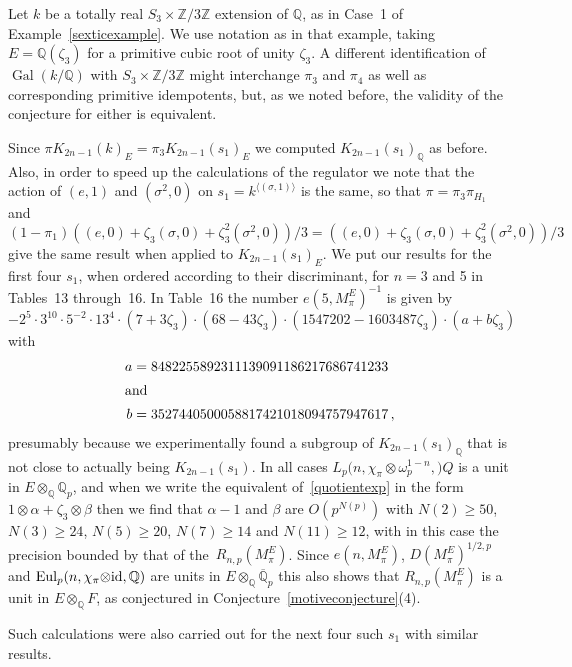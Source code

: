 \documentclass{amsart}
\begin{document}
\begin{example}\label{sexticcomputation}
Let $ k $ be a totally real $ S_3 \times {\mathbb Z}/3{\mathbb Z} $ extension of $ {\mathbb Q} $, as in Case~1 of Example~\ref{sexticexample}.
We use notation as in that example, taking $ E={\mathbb Q}({\zeta}_3) $ for a primitive cubic root of unity $ {\zeta}_3 $.
A different identification of $ {\operatorname{Gal}}(k/{\mathbb Q}) $ with $ S_3 \times {\mathbb Z}/3{\mathbb Z} $
might interchange $ \pi_3 $ and $ \pi_4 $ as well as
corresponding primitive idempotents, but, as we noted before, the validity of the conjecture for either is equivalent.

Since $ \pi {K_{2n-1}(k)_E}= \pi_3 {K_{2n-1}(s_1)_E}$ we computed $ {K_{2n-1}(s_1)_{\mathbb Q}}$ as before.
Also, in order to speed up the calculations of the regulator
we note that the action of $ (e,1) $ and $ ({\sigma}^2,0) $ on $ s_1 = k^{\langle ({\sigma},1) \rangle } $
is the same, so that $ \pi = \pi_3 \pi_{H_1} $ and
\begin{equation*}
(1-\pi_1) ((e,0) + {\zeta}_3 ({\sigma},0) + {\zeta}_3^2 ({\sigma}^2,0))/3 
=
((e,0) + {\zeta}_3 ({\sigma},0) + {\zeta}_3^2 ({\sigma}^2,0))/3 
\end{equation*}
give the same result when applied to $ {K_{2n-1}(s_1)_E}$.
We put our results for the first four $ s_1 $, when ordered according to their discriminant, for $ n=3 $ and 5 in Tables~13 through~16.
In Table~16 the number $ {e(5,M_\pi^E)}^{-1} $ is given by
\[
-2^5\cdot3^{10}\cdot5^{-2}\cdot13^{4}\cdot(7+3{\zeta}_3)\cdot(68-43{\zeta}_3)\cdot(1547202-1603487{\zeta}_3)\cdot(a+b{\zeta}_3)
\]
with
\begin{alignat*}{1}
a & = 8482255892311139091186217686741233 
\\
\intertext{and}
b & = 3527440500058817421018094757947617
\,,
\end{alignat*}
presumably because we experimentally found a subgroup of $ {K_{2n-1}(s_1)_{\mathbb Q}}$ that is not close to actually being
$ K_{2n-1}(s_1) $.
In all cases $ {L_{p}(n,\chi_\pi{\otimes}\omega_p^{1-n},{\mathbb)}Q} $ is a unit in $ E{\otimes}_{\mathbb Q}{{\mathbb Q_p}} $, and
when we write the equivalent of~\eqref{quotientexp} in the form $ 1 {\otimes} {\alpha}  + {\zeta}_3 {\otimes} {\beta} $ then
we find that $ {\alpha}-1 $ and $ {\beta} $ are $ O(p^{N(p)}) $ with
$ N(2) \ge 50 $, $ N(3) \ge 24 $, $ N(5) \ge 20 $, $ N(7) \ge 14 $ and $ N(11) \ge 12 $, with in this case
the precision bounded by that of the~$ R_{n,p}(M_\pi^E) $.
Since $ e(n,M_\pi^E) $, $ D(M_\pi^E)^{1/2,p} $ and $ {\textup{Eul}}_p(n, \chi_\pi{\otimes}{\textup{id}},{\mathbb Q}) $ are units in
$ E{\otimes}_{\mathbb Q}{{\overline {\mathbb Q}_p}} $ this also shows that $ R_{n,p}(M_\pi^E) $ is a unit in $ E{\otimes}_{\mathbb Q} F $, as conjectured
in Conjecture~\ref{motiveconjecture}(4).

Such calculations were also carried out for the next four such $ s_1 $ with similar results.
\end{example}
\end{document}
